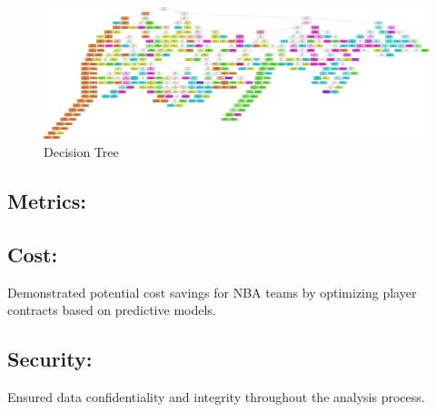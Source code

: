 \documentclass{article}
\begin{document}
\FloatBarrier
\begin{figure}[h]
    \centering
    \includegraphics[width=0.9\linewidth]{salary.png}
    \caption{Decision Tree}
    \label{fig:confusion_matrix_code}
\end{figure}



\subsection*{Metrics:}
\subsection*{Cost:}
Demonstrated potential cost savings for NBA teams by optimizing player contracts based on predictive models.
\subsection*{Security:}
Ensured data confidentiality and integrity throughout the analysis process.
\end{document}
